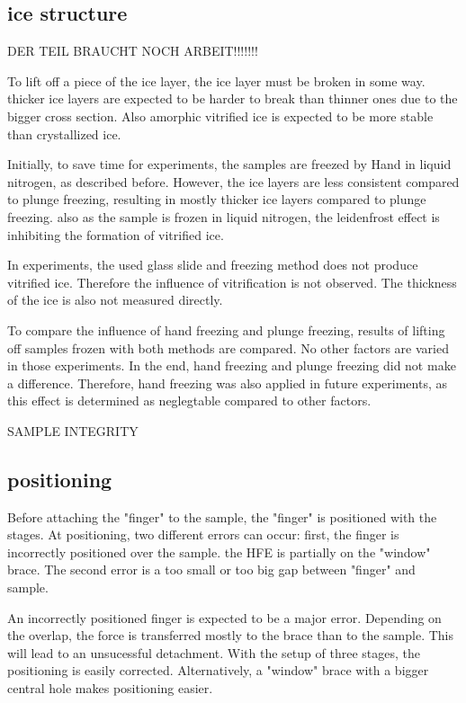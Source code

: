 \subsection{ice structure}

DER TEIL BRAUCHT NOCH ARBEIT!!!!!!!

To lift off a piece of the ice layer, the ice layer must be broken in some way. thicker ice layers are expected to be harder to break than thinner ones due to the bigger cross section. Also amorphic vitrified ice is expected to be more stable than crystallized ice.

Initially, to save time for experiments, the samples are freezed by Hand in liquid nitrogen, as described before. However, the ice layers are less consistent compared to plunge freezing, resulting in mostly thicker ice layers compared to plunge freezing. also as the sample is frozen in liquid nitrogen, the leidenfrost effect is inhibiting the formation of vitrified ice.

In experiments, the used glass slide and freezing method does not produce vitrified ice. Therefore the influence of vitrification is not observed. The thickness of the ice is also not measured directly. 

To compare the influence of hand freezing and plunge freezing, results of lifting off samples frozen with both methods are compared. No other factors are varied in those experiments. In the end, hand freezing and plunge freezing did not make a difference. Therefore, hand freezing was also applied in future experiments, as this effect is determined as neglegtable compared to other factors.

SAMPLE INTEGRITY

\subsection{positioning}
\label{section:positioning}

Before attaching the "finger" to the sample, the "finger" is positioned with the stages. At positioning, two different errors can occur: first, the finger is incorrectly positioned over the sample. the HFE is partially on the "window" brace. The second error is a too small or too big gap between "finger" and sample. 

An incorrectly positioned finger is expected to be a major error. Depending on the overlap, the force is transferred mostly to the brace than to the sample. This will lead to an unsucessful detachment. With the setup of three stages, the positioning is easily corrected. Alternatively, a "window" brace with a bigger central hole makes positioning easier.

